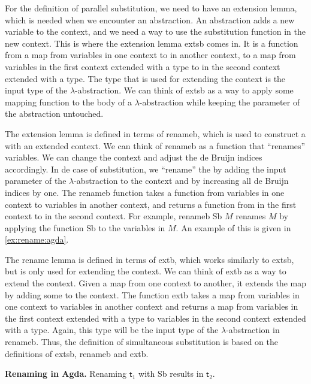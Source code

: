 For the definition of parallel substitution, we need to have an extension lemma, which is needed when we encounter an abstraction.
An abstraction adds a new variable to the context, and we need a way to use the substitution function in the new context.
This is where the extension lemma \textsf{extsb} comes in.
It is a function from a map from variables in one context to \lterms in another context,
to a map from variables in the first context extended with a type to \lterms in the second context extended with a type.
The type that is used for extending the context is the input type of the $\lambda$-abstraction.
We can think of \textsf{extsb} as a way to apply some mapping function to the body of a $\lambda$-abstraction
while keeping the parameter of the abstraction untouched.

The extension lemma is defined in terms of \textsf{renameb}, which is used to construct a \lterm with an extended context.
We can think of \textsf{renameb} as a function that ``renames'' variables. We can change the context and adjust the de Bruijn indices accordingly.
In de case of substitution, we ``rename'' the \lterm by adding the input parameter of the $\lambda$-abstraction to the context and by increasing all de Bruijn indices by one.
The \textsf{renameb} function takes a function from variables in one context to variables in another context,
and returns a function from \lterms in the first context to \lterms in the second context.
For example, \textsf{renameb Sb $M$} renames $M$ by applying the function \textsf{Sb} to the variables in $M$.
An example of this is given in \cref{ex:rename:agda}.

The rename lemma is defined in terms of \textsf{extb}, which works similarly to \textsf{extsb}, but is only used for extending the context.
We can think of \textsf{extb} as a way to extend the context. Given a map from one context to another, it extends the map by adding some \lterm to the context.
The function \textsf{extb} takes a map from variables in one context to variables in another context and returns a map from variables in the first context extended with a type to variables in the second context extended with a type.
Again, this type will be the input type of the $\lambda$-abstraction in \textsf{renameb}.
Thus, the definition of simultaneous substitution is based on the definitions of \textsf{extsb}, \textsf{renameb} and \textsf{extb}.

\begin{example}
  \label{ex:rename:agda}
  \textbf{Renaming in Agda.}
 Renaming $\textsf{t}_1$ with \textsf{Sb} results in $\textsf{t}_2$.
  
\end{example}

